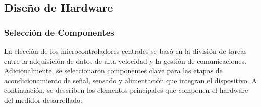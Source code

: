 \documentclass[12pt, a4paper]{article} %
\begin{document}
\subsection{Diseño de Hardware}

\subsubsection{Selección de Componentes}

La elección de los microcontroladores centrales se basó en la división de tareas entre la adquisición de datos de alta velocidad y la gestión de comunicaciones. Adicionalmente, se seleccionaron componentes clave para las etapas de acondicionamiento de señal, sensado y alimentación que integran el dispositivo. A continuación, se describen los elementos principales que componen el hardware del medidor desarrollado:
\end{document}
